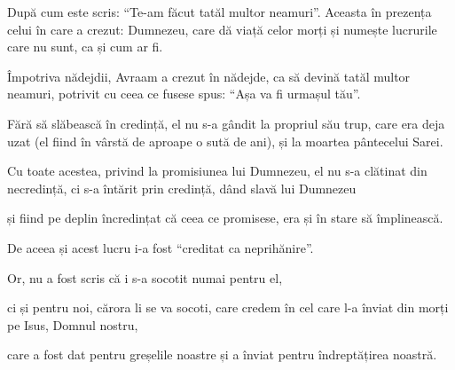 {După cum este scris: “Te-am făcut tatăl multor neamuri”. Aceasta în prezența celui în care a crezut: Dumnezeu, care dă viață celor morți și numește lucrurile care nu sunt, ca și cum ar fi.

Împotriva nădejdii, Avraam a crezut în nădejde, ca să devină tatăl multor neamuri, potrivit cu ceea ce fusese spus: “Așa va fi urmașul tău”.

Fără să slăbească în credință, el nu s-a gândit la propriul său trup, care era deja uzat (el fiind în vârstă de aproape o sută de ani), și la moartea pântecelui Sarei.

Cu toate acestea, privind la promisiunea lui Dumnezeu, el nu s-a clătinat din necredință, ci s-a întărit prin credință, dând slavă lui Dumnezeu

și fiind pe deplin încredințat că ceea ce promisese, era și în stare să împlinească.

De aceea și acest lucru i-a fost “creditat ca neprihănire”.

Or, nu a fost scris că i s-a socotit numai pentru el,

ci și pentru noi, cărora li se va socoti, care credem în cel care l-a înviat din morți pe Isus, Domnul nostru,

care a fost dat pentru greșelile noastre și a înviat pentru îndreptățirea noastră.



\par }
